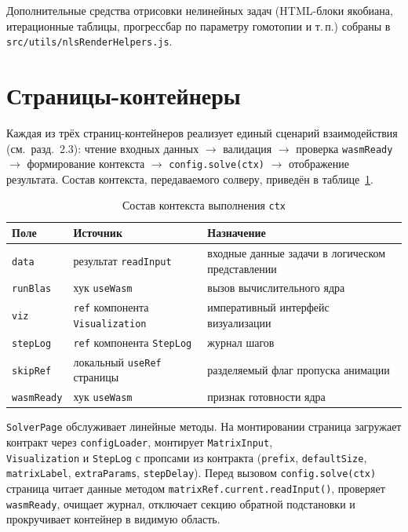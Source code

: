 \documentclass[12pt, oneside]{book}
\begin{document}
    \quad Дополнительные средства отрисовки нелинейных задач (HTML-блоки якобиана, итерационные таблицы, прогрессбар по параметру гомотопии и т.\,п.) собраны в \texttt{src/utils/nlsRenderHelpers.js}.

\section{Страницы-контейнеры}

    \quad Каждая из трёх страниц-контейнеров реализует единый сценарий взаимодействия (см.\ разд.~2.3): чтение входных данных $\to$ валидация $\to$ проверка \texttt{wasmReady} $\to$ формирование контекста $\to$ \texttt{config.solve(ctx)} $\to$ отображение результата. Состав контекста, передаваемого солверу, приведён в таблице~\ref{tab:ctx_fields}.

\begin{table}[!htbp]
\centering
\scriptsize
\renewcommand{\arraystretch}{1.15}
\begin{tabular}{|p{2.0cm}|p{4.2cm}|p{6.5cm}|}
\hline
\rowcolor{thbg} \textbf{Поле} & \textbf{Источник} & \textbf{Назначение} \\
\hline
\texttt{data} & результат \texttt{readInput} & входные данные задачи в логическом представлении \\ \hline
\texttt{runBlas} & хук \texttt{useWasm} & вызов вычислительного ядра \\ \hline
\texttt{viz} & \texttt{ref} компонента \texttt{Visualization} & императивный интерфейс визуализации \\ \hline
\texttt{stepLog} & \texttt{ref} компонента \texttt{StepLog} & журнал шагов \\ \hline
\texttt{skipRef} & локальный \texttt{useRef} страницы & разделяемый флаг пропуска анимации \\ \hline
\texttt{wasmReady} & хук \texttt{useWasm} & признак готовности ядра \\ \hline
\end{tabular}
\caption{Состав контекста выполнения \texttt{ctx}}
\label{tab:ctx_fields}
\end{table}

    \quad \texttt{SolverPage} обслуживает линейные методы. На монтировании страница загружает контракт через \texttt{configLoader}, монтирует \texttt{MatrixInput},\\ \texttt{Visualization} и \texttt{StepLog} с пропсами из контракта (\texttt{prefix}, \texttt{defaultSize},\\ \texttt{matrixLabel}, \texttt{extraParams}, \texttt{stepDelay}). Перед вызовом \texttt{config.solve(ctx)} страница читает данные методом \texttt{matrixRef.current.readInput()}, проверяет \texttt{wasmReady}, очищает журнал, отключает секцию обратной подстановки и прокручивает контейнер в видимую область.
\end{document}
